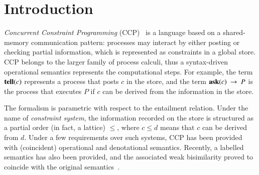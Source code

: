 \documentclass[main.tex]{subfiles}
\begin{document}
\section{Introduction}\label{sec:introduction}



\emph{Concurrent Constraint Programming} (CCP)~\cite{popl91} is  a language based on a shared-memory communication pattern: processes may interact 
by either posting or checking partial information, which is represented as constraints in a global store. 
%
CCP belongs to the larger family of process calculi, thus a syntax-driven operational semantics 
represents the computational steps. For example, the term ${\bf tell}(c)$ represents a process that posts $c$ in the store, 
and the term ${\bf ask}(c) \ \rightarrow \ P$ is the process that executes $P$ if $c$ can be derived from the information 
in the store. 

The formalism is parametric with respect to the entailment relation. Under the name of \emph{constraint system}, 
the information recorded on the store is structured as a partial order (in fact, a lattice) $\leq$, where $c\leq d$ means that $c$ can be derived from $d$.
%
Under a few requirements over such systems, CCP has been provided with (coincident) operational and denotational semantics. Recently, a
labelled semantics has also been provided, and the associated weak bisimilarity proved to coincide with the original semantics~\cite{pippo}.


\end{document}
